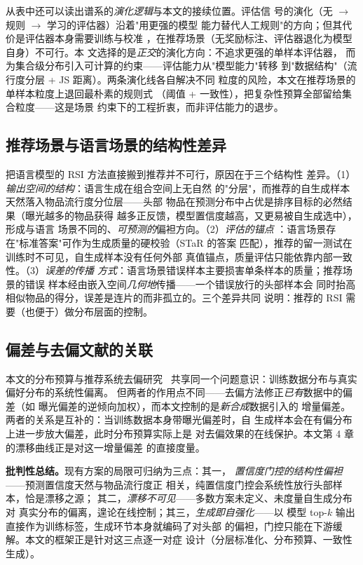 从表中还可以读出谱系的\emph{演化逻辑}与本文的接续位置。评估信
号的演化（无 $\to$ 规则 $\to$ 学习的评估器）沿着"用更强的模型
能力替代人工规则"的方向；但其代价是评估器本身需要训练与校准
，在推荐场景（无奖励标注、评估器退化为模型自身）不可行。本
文选择的是\emph{正交}的演化方向：不追求更强的单样本评估器，
而为集合级分布引入可计算的约束——评估能力从"模型能力"转移
到"数据结构"（流行度分层 + JS 距离）。两条演化线各自解决不同
粒度的风险，本文在推荐场景的单样本粒度上退回最朴素的规则式
（阈值 + 一致性），把复杂性预算全部留给集合粒度——这是场景
约束下的工程折衷，而非评估能力的退步。

\subsection{推荐场景与语言场景的结构性差异}
把语言模型的 RSI 方法直接搬到推荐并不可行，原因在于三个结构性
差异。（1）\emph{输出空间的结构}：语言生成在组合空间上无自然
的"分层"，而推荐的自生成样本天然落入物品流行度分位层——头部
物品在预测分布中占优是排序目标的必然结果（曝光越多的物品获得
越多正反馈，模型置信度越高，又更易被自生成选中），形成与语言
场景不同的、\emph{可预测的}偏袒方向。（2）\emph{评估的锚点}
：语言场景存在"标准答案"可作为生成质量的硬校验（STaR 的答案
匹配），推荐的留一测试在训练时不可见，自生成样本没有任何外部
真值锚点，质量评估只能依靠内部一致性。（3）\emph{误差的传播
方式}：语言场景错误样本主要损害单条样本的质量；推荐场景的错误
样本经由嵌入空间\emph{几何地}传播——一个错误放行的头部样本会
同时抬高相似物品的得分，误差是连片的而非孤立的。三个差异共同
说明：推荐的 RSI 需要（也便于）做分布层面的控制。

\subsection{偏差与去偏文献的关联}
本文的分布预算与推荐系统去偏研究~\cite{schnabel2016debias}
共享同一个问题意识：训练数据分布与真实偏好分布的系统性偏离。
但两者的作用点不同——去偏方法修正\emph{已有}数据中的偏差（如
曝光偏差的逆倾向加权），而本文控制的是\emph{新合成}数据引入的
增量偏差。两者的关系是互补的：当训练数据本身带曝光偏差时，自
生成样本会在有偏分布上进一步放大偏差，此时分布预算实际上是
对去偏效果的在线保护。本文第 4 章的漂移曲线正是对这一增量偏差
的直接度量。

\textbf{批判性总结。}现有方案的局限可归纳为三点：其一，
\emph{置信度门控的结构性偏袒}——预测置信度天然与物品流行度正
相关，纯置信度门控会系统性放行头部样本，恰是漂移之源；
其二，\emph{漂移不可见}——多数方案未定义、未度量自生成分布对
真实分布的偏离，遑论在线控制；其三，\emph{生成即自强化}——以
模型 top-$k$ 输出直接作为训练标签，生成环节本身就编码了对头部
的偏袒，门控只能在下游缓解。本文的框架正是针对这三点逐一对症
设计（分层标准化、分布预算、一致性生成）。

